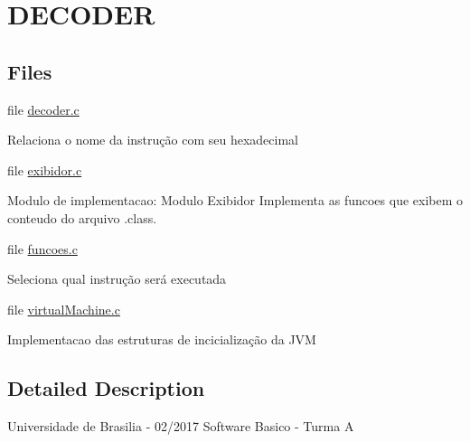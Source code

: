 \hypertarget{group__MODULO}{}\section{D\+E\+C\+O\+D\+ER}
\label{group__MODULO}




  


\subsection*{Files}
\begin{DoxyCompactItemize}
\item 
file \mbox{\hyperlink{decoder_8c}{decoder.\+c}}
\begin{DoxyCompactList}\small\item\em \begin{DoxyVerb}         Relaciona o nome da instrução com seu hexadecimal\end{DoxyVerb}
 \end{DoxyCompactList}\item 
file \mbox{\hyperlink{exibidor_8c}{exibidor.\+c}}
\begin{DoxyCompactList}\small\item\em \begin{DoxyVerb}         Modulo de implementacao: Modulo Exibidor
         Implementa as funcoes que exibem o conteudo do arquivo .class.\end{DoxyVerb}
 \end{DoxyCompactList}\item 
file \mbox{\hyperlink{funcoes_8c}{funcoes.\+c}}
\begin{DoxyCompactList}\small\item\em \begin{DoxyVerb}         Seleciona qual instrução será executada\end{DoxyVerb}
 \end{DoxyCompactList}\item 
file \mbox{\hyperlink{virtualMachine_8c}{virtual\+Machine.\+c}}
\begin{DoxyCompactList}\small\item\em \begin{DoxyVerb}         Implementacao das estruturas de incicialização da JVM\end{DoxyVerb}
 \end{DoxyCompactList}\end{DoxyCompactItemize}


\subsection{Detailed Description}


 

Universidade de Brasilia -\/ 02/2017 Software Basico -\/ Turma A 
